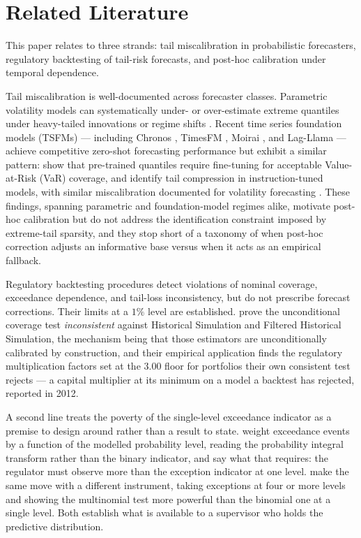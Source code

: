 \documentclass[preprint,11pt,authoryear]{elsarticle}
\newcommand{\1}{\boldsymbol{1}}
\begin{document}
\section{Related Literature}
\label{sec:lit}

This paper relates to three strands: tail miscalibration in probabilistic forecasters, regulatory backtesting of tail-risk forecasts, and post-hoc calibration under temporal dependence.

Tail miscalibration is well-documented across forecaster classes. Parametric volatility models can systematically under- or over-estimate extreme quantiles under heavy-tailed innovations or regime shifts \citep{christoffersen1998,mcneil2000estimation,nolde2017elicitability}. Recent time series foundation models (TSFMs) --- including Chronos \citep{ansari2024chronos,ansari2025chronos2}, TimesFM \citep{das2024timesfm}, Moirai \citep{woo2024moirai,liu2025moirai}, and Lag-Llama \citep{rasul2024lagllama} --- achieve competitive zero-shot forecasting performance but exhibit a similar pattern: \citet{goel2024tsfmvar} show that pre-trained quantiles require fine-tuning for acceptable Value-at-Risk (VaR) coverage, and \citet{pele2025llmvar} identify tail compression in instruction-tuned models, with similar miscalibration documented for volatility forecasting \citep{goel2025volatility,rahimikia2025revisiting}. These findings, spanning parametric and foundation-model regimes alike, motivate post-hoc calibration but do not address the identification constraint imposed by extreme-tail sparsity, and they stop short of a taxonomy of when post-hoc correction adjusts an informative base versus when it acts as an empirical fallback.

Regulatory backtesting procedures \citep{kupiec1995,christoffersen1998,basel1996,acerbi2014back,fissler2016higher,nolde2017elicitability} detect violations of nominal coverage, exceedance dependence, and tail-loss inconsistency, but do not prescribe forecast corrections. Their limits at a $1\%$ level are established. \citet{escanciano2012pitfalls} prove the unconditional coverage test \emph{inconsistent} against Historical Simulation and Filtered Historical Simulation, the mechanism being that those estimators are unconditionally calibrated by construction, and their empirical application finds the regulatory multiplication factors set at the $3.00$ floor for portfolios their own consistent test rejects --- a capital multiplier at its minimum on a model a backtest has rejected, reported in 2012.

A second line treats the poverty of the single-level exceedance indicator as a premise to design around rather than a result to state. \citet{gordy2020spectral} weight exceedance events by a function of the modelled probability level, reading the probability integral transform rather than the binary indicator, and say what that requires: the regulator must observe more than the exception indicator at one level. \citet{kratz2018multinomial} make the same move with a different instrument, taking exceptions at four or more levels and showing the multinomial test more powerful than the binomial one at a single level. Both establish what is available to a supervisor who holds the predictive distribution.
\end{document}
